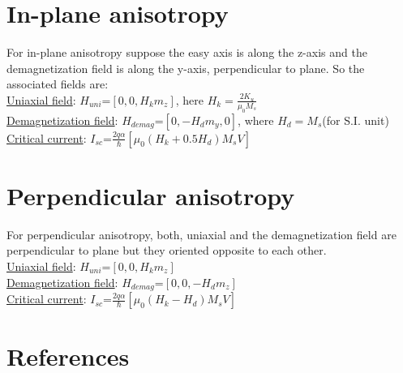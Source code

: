 \documentclass[review]{elsarticle}
\begin{document}
\section{In-plane anisotropy}
For in-plane anisotropy suppose the easy axis is along the z-axis and the demagnetization field is along the y-axis, perpendicular to plane. So the associated fields are:\\
\underline{Uniaxial field}: $H_{uni}$=$\left[0,0,H_km_z\right]$, here $H_k=\frac{2 K_u}{\mu_0 M_s}$\\
\underline{Demagnetization field}: $H_{demag}$=$\left[0,-H_d m_y, 0\right]$, where $H_d=M_s$(for S.I. unit)\\
\underline{Critical current}: $I_{sc}$=$\frac{2 q \alpha}{\hbar}\left[\mu_0(H_k+0.5H_d)M_s V\right]$

\section{Perpendicular anisotropy}
For perpendicular anisotropy, both, uniaxial and the demagnetization field are perpendicular to plane but they oriented opposite to each other.\\
\underline{Uniaxial field}: $H_{uni}$=$\left[0,0,H_km_z\right]$\\%
\underline{Demagnetization field}: $H_{demag}$=$\left[0,0,-H_d m_z\right]$\\ %
\underline{Critical current}: $I_{sc}$=$\frac{2 q \alpha}{\hbar}\left[\mu_0(H_k-H_d)M_s V\right]$










\section{References}


\end{document}
